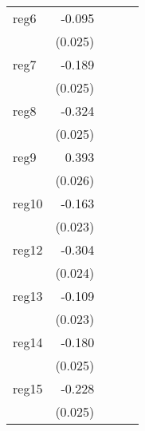 {\begin{longtable}{l*{4}{D{.}{.}{-1}}}
\addlinespace
reg6        &      -0.095\sym{***}&                     &                     &                     \\
            &     (0.025)         &                     &                     &                     \\
\addlinespace
reg7        &      -0.189\sym{***}&                     &                     &                     \\
            &     (0.025)         &                     &                     &                     \\
\addlinespace
reg8        &      -0.324\sym{***}&                     &                     &                     \\
            &     (0.025)         &                     &                     &                     \\
\addlinespace
reg9        &       0.393\sym{***}&                     &                     &                     \\
            &     (0.026)         &                     &                     &                     \\
\addlinespace
reg10       &      -0.163\sym{***}&                     &                     &                     \\
            &     (0.023)         &                     &                     &                     \\
\addlinespace
reg12       &      -0.304\sym{***}&                     &                     &                     \\
            &     (0.024)         &                     &                     &                     \\
\addlinespace
reg13       &      -0.109\sym{***}&                     &                     &                     \\
            &     (0.023)         &                     &                     &                     \\
\addlinespace
reg14       &      -0.180\sym{***}&                     &                     &                     \\
            &     (0.025)         &                     &                     &                     \\
\addlinespace
reg15       &      -0.228\sym{***}&                     &                     &                     \\
            &     (0.025)         &                     &                     &                     \\

\end{longtable}}
